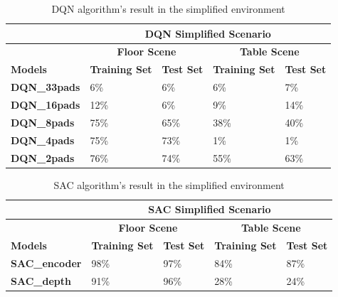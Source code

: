 \begin{table}[!htbp]
    \begin{tabular}{|l|l|l|l|l|}
    \hline
                         & \multicolumn{4}{c|}{\textbf{DQN Simplified Scenario}}                                 \\ \hline
                         & \multicolumn{2}{c|}{\textbf{Floor Scene}} & \multicolumn{2}{c|}{\textbf{Table Scene}} \\ \hline
    \textbf{Models}      & \textbf{Training Set} & \textbf{Test Set} & \textbf{Training Set} & \textbf{Test Set} \\ \hline
    \textbf{DQN\_33pads} & 6\%                   & 6\%               & 6\%                   & 7\%               \\ \hline
    \textbf{DQN\_16pads} & 12\%                  & 6\%               & 9\%                   & 14\%              \\ \hline
    \textbf{DQN\_8pads}  & 75\%                  & 65\%              & 38\%                  & 40\%              \\ \hline
    \textbf{DQN\_4pads}  & 75\%                  & 73\%              & 1\%                   & 1\%               \\ \hline
    \textbf{DQN\_2pads}  & 76\%                  & 74\%              & 55\%                  & 63\%              \\ \hline
    \end{tabular}
    \caption{DQN algorithm's result in the simplified environment}
\end{table}



\begin{table}[!htbp]
    \begin{tabular}{|l|l|l|l|l|}
    \hline
                                    & \multicolumn{4}{c|}{\textbf{SAC Simplified  Scenario}}                         \\ \hline
                                    & \multicolumn{2}{c|}{\textbf{Floor Scene}} & \multicolumn{2}{c|}{\textbf{Table Scene}} \\ \hline
    \textbf{Models}                 & \textbf{Training Set}   & \textbf{Test Set}  & \textbf{Training Set} & \textbf{Test Set} \\ \hline
    \textbf{SAC\_encoder} & 98\%                 & 97\%               & 84\%                  & 87\%              \\ \hline
    \textbf{SAC\_depth}   & 91\%                 & 96\%               & 28\%                  & 24\%              \\ \hline
    \end{tabular}
    \caption{SAC algorithm's result in the simplified environment}
\end{table}

